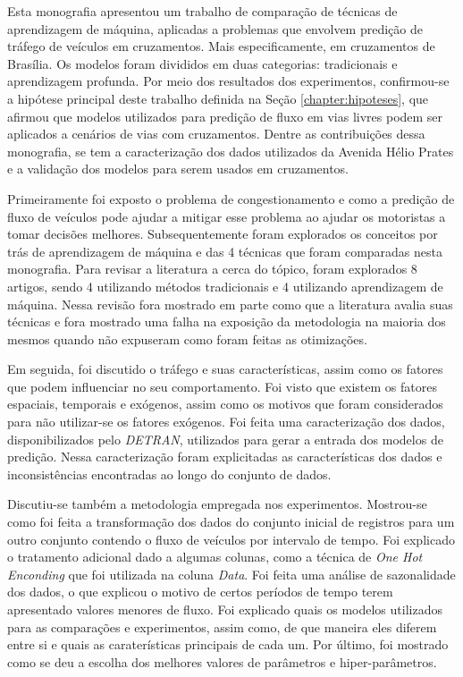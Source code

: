 Esta monografia apresentou um trabalho de comparação de técnicas de aprendizagem de máquina, aplicadas a problemas que envolvem predição de tráfego de veículos em cruzamentos. Mais especificamente, em cruzamentos de Brasília. Os modelos foram divididos em duas categorias: tradicionais e aprendizagem profunda. Por meio dos resultados dos experimentos, confirmou-se a hipótese principal deste trabalho definida na Seção \ref{chapter:hipoteses}, que afirmou que modelos utilizados para predição de fluxo em vias livres podem ser aplicados a cenários de vias com cruzamentos. Dentre as contribuições dessa monografia, se tem a caracterização dos dados utilizados da Avenida Hélio Prates e a validação dos modelos para serem usados em cruzamentos.

Primeiramente foi exposto o problema de congestionamento e como a predição de fluxo de veículos pode ajudar a mitigar esse problema ao ajudar os motoristas a tomar decisões melhores. Subsequentemente foram explorados os conceitos por trás de aprendizagem de máquina e das 4 técnicas que foram comparadas nesta monografia. Para revisar a literatura a cerca do tópico, foram explorados 8 artigos, sendo 4 utilizando métodos tradicionais e 4 utilizando aprendizagem de máquina. Nessa revisão fora mostrado em parte como que a literatura avalia suas técnicas e fora mostrado uma falha na exposição da metodologia na maioria dos mesmos quando não expuseram como foram feitas as otimizações.  

Em seguida, foi discutido o tráfego e suas características, assim como os fatores que podem influenciar no seu comportamento. Foi visto que existem os fatores espaciais, temporais e exógenos, assim como os motivos que foram considerados para não utilizar-se os fatores exógenos. Foi feita uma caracterização dos dados, disponibilizados pelo \textit{\acrshort{DETRAN}}, utilizados para gerar a entrada dos modelos de predição. Nessa caracterização foram explicitadas as características dos dados e inconsistências encontradas ao longo do conjunto de dados.

Discutiu-se também a metodologia empregada nos experimentos. Mostrou-se como foi feita a transformação dos dados do conjunto inicial de registros para um outro conjunto contendo o fluxo de veículos por intervalo de tempo. Foi explicado o tratamento adicional dado a algumas colunas, como a técnica de \textit{One Hot Enconding} que foi utilizada na coluna \textit{Data}. Foi feita uma análise de sazonalidade dos dados, o que explicou o motivo de certos períodos de tempo terem apresentado valores menores de fluxo. Foi explicado quais os modelos utilizados para as comparações e experimentos, assim como, de que maneira eles diferem entre si e quais as caraterísticas principais de cada um. Por último, foi mostrado como se deu a escolha dos melhores valores de parâmetros e hiper-parâmetros.

